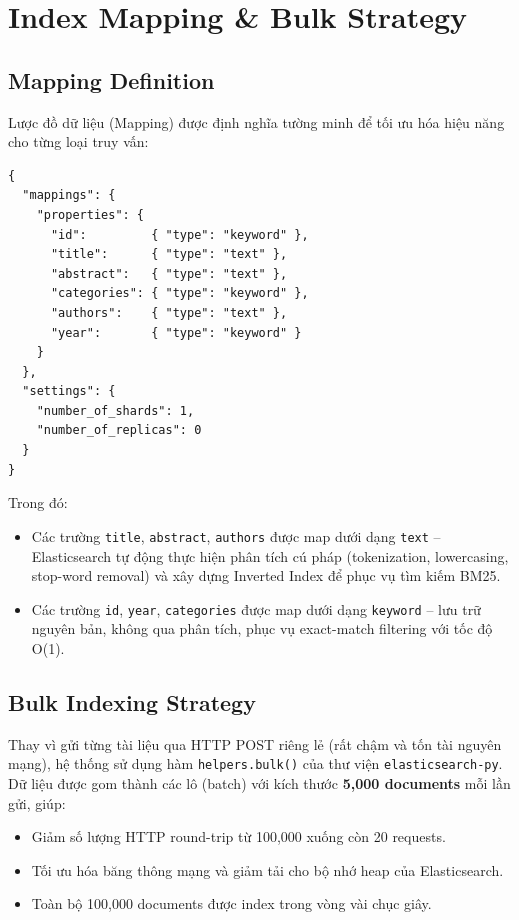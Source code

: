 \section{Index Mapping \& Bulk Strategy}

\subsection{Mapping Definition}
Lược đồ dữ liệu (Mapping) được định nghĩa tường minh để tối ưu hóa hiệu năng cho từng loại truy vấn:

\begin{lstlisting}[caption={Elasticsearch Index Mapping},label={lst:mapping}]
{
  "mappings": {
    "properties": {
      "id":         { "type": "keyword" },
      "title":      { "type": "text" },
      "abstract":   { "type": "text" },
      "categories": { "type": "keyword" },
      "authors":    { "type": "text" },
      "year":       { "type": "keyword" }
    }
  },
  "settings": {
    "number_of_shards": 1,
    "number_of_replicas": 0
  }
}
\end{lstlisting}

Trong đó:
\begin{itemize}
    \item Các trường \texttt{title}, \texttt{abstract}, \texttt{authors} được map dưới dạng \texttt{text} -- Elasticsearch tự động thực hiện phân tích cú pháp (tokenization, lowercasing, stop-word removal) và xây dựng Inverted Index để phục vụ tìm kiếm BM25.
    \item Các trường \texttt{id}, \texttt{year}, \texttt{categories} được map dưới dạng \texttt{keyword} -- lưu trữ nguyên bản, không qua phân tích, phục vụ exact-match filtering với tốc độ O(1).
\end{itemize}

\subsection{Bulk Indexing Strategy}
Thay vì gửi từng tài liệu qua HTTP POST riêng lẻ (rất chậm và tốn tài nguyên mạng), hệ thống sử dụng hàm \texttt{helpers.bulk()} của thư viện \texttt{elasticsearch-py}. Dữ liệu được gom thành các lô (batch) với kích thước \textbf{5,000 documents} mỗi lần gửi, giúp:
\begin{itemize}
    \item Giảm số lượng HTTP round-trip từ 100,000 xuống còn 20 requests.
    \item Tối ưu hóa băng thông mạng và giảm tải cho bộ nhớ heap của Elasticsearch.
    \item Toàn bộ 100,000 documents được index trong vòng vài chục giây.
\end{itemize}